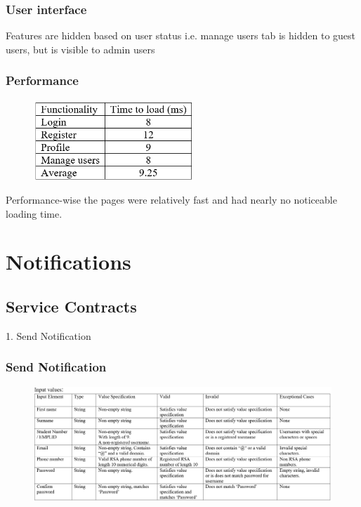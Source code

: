 \documentclass[english]{article}
\begin{document}
\subsubsection{User interface}
Features are hidden based on user status i.e. manage users tab is hidden to guest users, but is visible to admin users\\
\subsubsection{Performance}
\begin{figure}[H]
\includegraphics[width=60mm]{15.png}
\end{figure}
Performance-wise the pages were relatively fast and had nearly no noticeable loading time.
\section{Notifications}
\subsection{Service Contracts}
1.	Send Notification\\

\subsubsection{Send Notification}
\begin{figure}[H]
    \label{tab:example}
\hspace*{-2.5cm}
\includegraphics[width=180mm]{5.png}
\end{figure}
\end{document}
